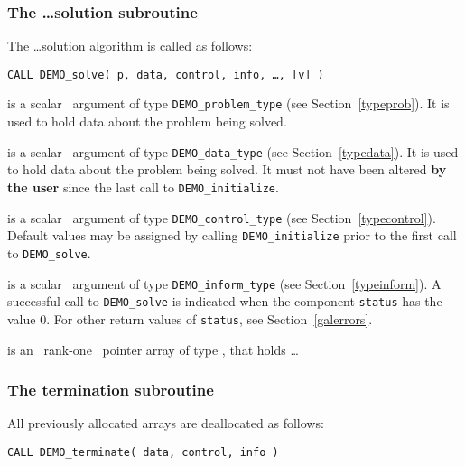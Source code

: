 \documentclass{galahad}
\newcommand{\packagename}{DEMO}
\begin{document}

\subsubsection{The \ldots solution subroutine}
The \ldots solution algorithm is called as follows:
\vspace*{1mm}

\hspace{8mm}
{\tt CALL \packagename\_solve( p, data, control, info, \ldots, [v] )}

\vspace*{-3mm}
\begin{description}
 is a scalar \intentinout\ argument of type 
{\tt \packagename\_problem\_type}
(see Section~\ref{typeprob}). 
It is used to hold data about the problem being solved.

 is a scalar \intentinout\ argument of type 
{\tt \packagename\_data\_type}
(see Section~\ref{typedata}). It is used to hold data about the problem being 
solved. It must not have been altered {\bf by the user} since the last call to 
{\tt \packagename\_initialize}.

 is a scalar \intentin\ argument of type 
{\tt \packagename\_control\_type}
(see Section~\ref{typecontrol}). Default values may be assigned by calling 
{\tt \packagename\_initialize} 
prior to the first call to 
{\tt \packagename\_solve}.

 is a scalar \intentout\ argument of type 
{\tt \packagename\_inform\_type}
(see Section~\ref{typeinform}). A successful call to
{\tt \packagename\_solve}
is indicated when the  component {\tt status} has the value 0. 
For other return values of {\tt status}, see Section~\ref{galerrors}.

 is an \optional\ rank-one \intentin\ pointer array of type 
 \realdp,  that holds \ldots

\end{description}


\subsubsection{The  termination subroutine}
All previously allocated arrays are deallocated as follows:
\vspace*{1mm}

\hspace{8mm}
{\tt CALL \packagename\_terminate( data, control, info )}
\end{document}
